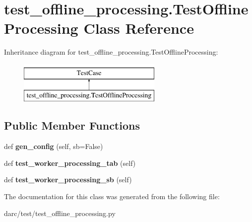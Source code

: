 \hypertarget{classtest__offline__processing_1_1_test_offline_processing}{}\section{test\+\_\+offline\+\_\+processing.\+Test\+Offline\+Processing Class Reference}
\label{classtest__offline__processing_1_1_test_offline_processing}
Inheritance diagram for test\+\_\+offline\+\_\+processing.\+Test\+Offline\+Processing\+:\begin{figure}[H]
\begin{center}
\leavevmode
\includegraphics[height=2.000000cm]{classtest__offline__processing_1_1_test_offline_processing}
\end{center}
\end{figure}
\subsection*{Public Member Functions}
\begin{DoxyCompactItemize}
\item 
\mbox{\label{classtest__offline__processing_1_1_test_offline_processing_a8c67bd1c3995812851d8926397d3b25d}} 
def {\bfseries gen\+\_\+config} (self, sb=False)
\item 
\mbox{\label{classtest__offline__processing_1_1_test_offline_processing_a1f6f78251777b1d230957a1454d706c1}} 
def {\bfseries test\+\_\+worker\+\_\+processing\+\_\+tab} (self)
\item 
\mbox{\label{classtest__offline__processing_1_1_test_offline_processing_a3f9d5300cff188897843e6d4c2060f2f}} 
def {\bfseries test\+\_\+worker\+\_\+processing\+\_\+sb} (self)
\end{DoxyCompactItemize}


The documentation for this class was generated from the following file\+:\begin{DoxyCompactItemize}
\item 
darc/test/test\+\_\+offline\+\_\+processing.\+py\end{DoxyCompactItemize}
